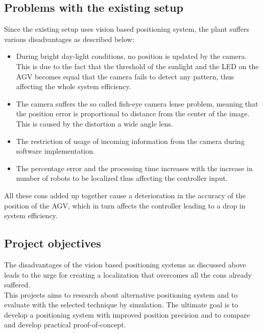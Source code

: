 \subsection{Problems with the existing setup}

Since the existing setup uses vision based positioning system, the plant suffers various disadvantages as described below:
\begin{itemize}
\item During bright day-light conditions, no position is updated by the camera. This is due to the fact that the threshold of the sunlight and the LED on the AGV becomes equal that the camera fails to detect any pattern, thus affecting the whole system efficiency.
\item The camera suffers the so called fish-eye camera lense problem, meaning that the position error is proportional to  distance from the center of the image. This is caused by the distortion a wide angle lens.
\item The restriction of usage of incoming information from the camera during software implementation.
\item The percentage error and the processing time increases with the increase in number of robots to be localized thus affecting the controller input.
\end{itemize}


All these cons added up together cause a deterioration in the accuracy of the position of the AGV, which in turn affects the controller leading to a drop in system efficiency. 

\subsection{Project objectives}

The disadvantages of the vision based positioning systems as discussed above leads to the urge for creating a localization that overcomes all the cons already suffered.\\

This projects aims to research about alternative positioning system and to evaluate with the selected technique by simulation. The ultimate goal is to develop a positioning system with  improved position precision and to compare and develop practical proof-of-concept.

